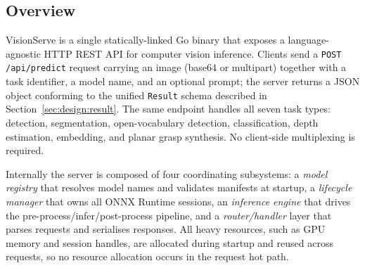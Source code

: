 
\subsection{Overview}
\label{sec:design:overview}

VisionServe is a single statically-linked Go binary that exposes a
language-agnostic HTTP REST API for computer vision inference.
Clients send a \texttt{POST /api/predict} request carrying an image (base64
or multipart) together with a task identifier, a model name, and an optional
prompt; the server returns a JSON object conforming to the unified
\texttt{Result} schema described in Section~\ref{sec:design:result}.
The same endpoint handles all seven task types: detection,
segmentation, open-vocabulary detection, classification, depth estimation,
embedding, and planar grasp synthesis. No client-side multiplexing is required.

Internally the server is composed of four coordinating subsystems: a
\emph{model registry} that resolves model names and validates manifests at
startup, a \emph{lifecycle manager} that owns all ONNX Runtime sessions, an
\emph{inference engine} that drives the pre-process/infer/post-process
pipeline, and a \emph{router/handler} layer that parses requests and serialises
responses.
All heavy resources, such as GPU memory and session handles, are allocated during startup
and reused across requests, so no resource allocation occurs in the request hot
path.

